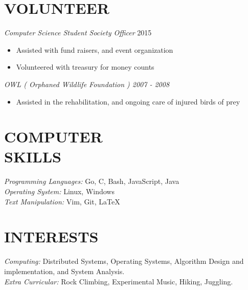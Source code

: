 \documentclass[line,margin]{res}
\begin{document}
\begin{resume}
\section{VOLUNTEER}
{\sl Computer Science Student Society Officer} \hfill 2015
    \begin{itemize}
        \item Assisted with fund raisers, and event organization
        \item Volunteered with treasury for money counts
    \end{itemize}

{\sl OWL ( Orphaned Wildlife Foundation ) {\hfill 2007 - 2008}
    \begin{itemize}
         \item Assisted in the rehabilitation, and ongoing care of injured birds of prey
    \end{itemize}
}
    

\section{COMPUTER \\ SKILLS} 
	{\sl Programming Languages:} Go, C, Bash, JavaScript, Java\\
	{\sl Operating System:} Linux, Windows\\
	{\sl Text Manipulation:} Vim, Git, \LaTeX \\

\section{INTERESTS}
	{\sl Computing:}  Distributed Systems, Operating Systems, Algorithm Design and implementation, and System Analysis.\\
	{\sl Extra Curricular:} Rock Climbing, Experimental Music, Hiking, Juggling.\\

\end{resume}
\end{document}
